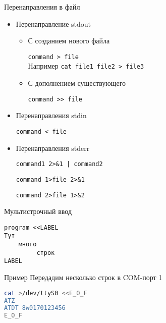 \begin{frame}{Перенаправления в файл}

\begin{itemize}
  \item Перенаправление stdout 
    \begin{itemize}
      \item С созданием нового файла

        {\tt command > file}\\
		Например {\tt cat file1 file2 > file3}
      \item С дополнением существующего

		  {\tt command >\phantom{}>  file}
    \end{itemize}
    \pause
  \item Перенаправления stdin

    {\tt command < file}
    \pause
  \item Перенаправления stderr

    {\tt command1 2>\&1 | command2}

   {\tt command 1>file 2>\&1}

   {\tt command 2>file 1>\&2}
\end{itemize}

\end{frame}

\begin{frame}[fragile]{Мультистрочный ввод}

\begin{verbatim}
program <<LABEL
Тут
    много
	     строк
LABEL
\end{verbatim}

	\pause
	\begin{block}{Пример}
	Передадим несколько строк в COM-порт 1
\begin{lstlisting}[language=bash]
cat >/dev/ttyS0 <<E_O_F
ATZ
ATDT 8w0170123456
E_O_F
\end{lstlisting}
	\end{block}
\end{frame}


